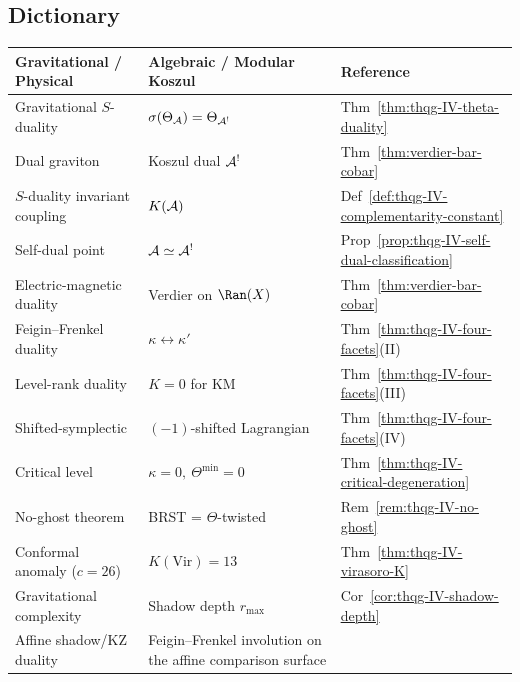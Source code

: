 %
%

\subsection{Dictionary}
\label{subsec:thqg-IV-dictionary}

\begin{center}
\renewcommand{\arraystretch}{1.5}
\begin{tabular}{|>{\raggedright\arraybackslash}p{5.5cm}|%
 >{\raggedright\arraybackslash}p{5.5cm}|%
 >{\raggedright\arraybackslash}p{3cm}|}
\hline
\textbf{Gravitational / Physical} &
\textbf{Algebraic / Modular Koszul} & \textbf{Reference} \\
\hline\hline
Gravitational $S$-duality &
$\sigma(\Theta_{\mathcal{A}}) = \Theta_{\mathcal{A}^!}$ & Thm~\ref{thm:thqg-IV-theta-duality} \\
\hline
Dual graviton & Koszul dual $\mathcal{A}^!$ & Thm~\ref{thm:verdier-bar-cobar} \\
\hline
$S$-duality invariant coupling &
$K(\mathcal{A})$ & Def~\ref{def:thqg-IV-complementarity-constant} \\
\hline
Self-dual point & $\mathcal{A} \simeq \mathcal{A}^!$ &
Prop~\ref{prop:thqg-IV-self-dual-classification} \\
\hline
Electric-magnetic duality &
Verdier on $\Ran(X)$ & Thm~\ref{thm:verdier-bar-cobar} \\
\hline
Feigin--Frenkel duality &
$\kappa \leftrightarrow \kappa'$ & Thm~\ref{thm:thqg-IV-four-facets}(II) \\
\hline
Level-rank duality & $K = 0$ for KM &
Thm~\ref{thm:thqg-IV-four-facets}(III) \\
\hline
Shifted-symplectic &
$(-1)$-shifted Lagrangian & Thm~\ref{thm:thqg-IV-four-facets}(IV) \\
\hline
Critical level & $\kappa = 0,\ \Theta^{\min}=0$ &
Thm~\ref{thm:thqg-IV-critical-degeneration} \\
\hline
No-ghost theorem & BRST = $\Theta$-twisted &
Rem~\ref{rem:thqg-IV-no-ghost} \\
\hline
Conformal anomaly ($c = 26$) &
$K(\mathrm{Vir}) = 13$ & Thm~\ref{thm:thqg-IV-virasoro-K} \\
\hline
Gravitational complexity &
Shadow depth $r_{\max}$ & Cor~\ref{cor:thqg-IV-shadow-depth} \\
\hline
Affine shadow/KZ duality &
Feigin--Frenkel involution on the affine comparison surface &

\end{tabular}
\end{center}
